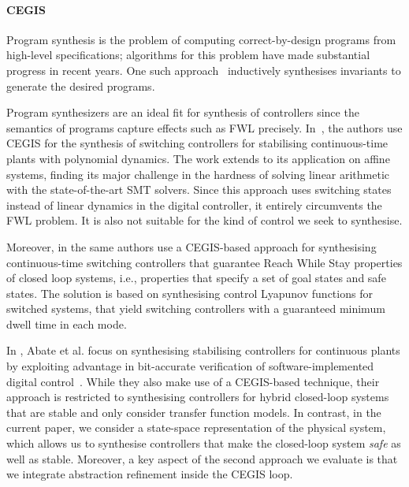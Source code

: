 \documentclass[runningheads,a4paper]{llncs}
\begin{document}
\paragraph{CEGIS}

Program synthesis is the problem of computing correct-by-design programs
from high-level specifications; algorithms for this problem have made
substantial progress in recent years.  One such
approach~\cite{itzhaky2010simple} inductively synthesises invariants to
generate the desired programs.

Program synthesizers are an ideal fit for synthesis of %
controllers since the semantics of programs capture effects such as FWL
precisely.  In~\cite{DBLP:conf/cdc/RavanbakhshS15}, the authors use CEGIS
for the synthesis of switching controllers for stabilising continuous-time
plants with polynomial dynamics.  The work extends to its application on
affine systems, finding its major challenge in the hardness of solving
linear arithmetic with the state-of-the-art SMT solvers.  Since this
approach uses switching states instead of linear dynamics in the digital
controller, it entirely circumvents the FWL problem.  It is also not
suitable for the kind of control we seek to synthesise.

Moreover, in \cite{DBLP:conf/emsoft/RavanbakhshS16} the same authors 
use a CEGIS-based approach for synthesising continuous-time switching
controllers that guarantee Reach While Stay properties of closed
loop systems, i.e., properties that specify a set of goal states and safe states.%
The solution is based on synthesising control Lyapunov
functions for switched systems, that yield switching controllers with
a guaranteed minimum dwell time in each mode.

In \cite{DBLP:journals/corr/AbateBCCDKK16}, Abate et al.  focus on
synthesising stabilising controllers for continuous plants
by exploiting advantage in bit-accurate verification of software-implemented 
digital control~\cite{Bessa16}.  While they also make use of a CEGIS-based 
technique, their approach is restricted to synthesising controllers for hybrid 
closed-loop systems that are stable and only consider transfer function models.  
In contrast, in the current paper, we consider a state-space
representation of the physical system, which allows us to synthesise controllers that
make the closed-loop system \emph{safe} as well as stable.  Moreover, 
a key aspect of the second approach we evaluate
is that we integrate abstraction
refinement inside the CEGIS loop.
\end{document}
